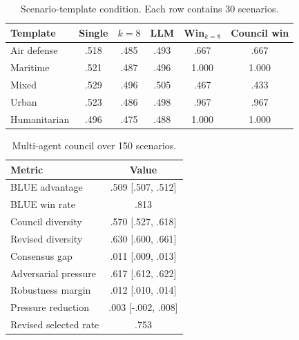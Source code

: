 \documentclass[letterpaper]{article} %
\begin{document}
\begin{table}[t]
\centering
\scriptsize
\caption{Scenario-template condition. Each row contains 30 scenarios.}
\label{tab:terrain}
\begin{tabular}{@{}lccccc@{}}
\toprule
Template & Single & $k{=}8$ & LLM & Win$_{k=8}$ & Council win \\
\midrule
Air defense & .518 & .485 & .493 & .667 & .667 \\
Maritime & .521 & .487 & .496 & 1.000 & 1.000 \\
Mixed & .529 & .496 & .505 & .467 & .433 \\
Urban & .523 & .486 & .498 & .967 & .967 \\
Humanitarian & .496 & .475 & .488 & 1.000 & 1.000 \\
\bottomrule
\end{tabular}
\end{table}

\begin{table}[t]
\centering
\scriptsize
\caption{Multi-agent council over 150 scenarios.}
\label{tab:council}
\begin{tabular}{@{}lc@{}}
\toprule
Metric & Value \\
\midrule
BLUE advantage & .509 [.507, .512] \\
BLUE win rate & .813 \\
Council diversity & .570 [.527, .618] \\
Revised diversity & .630 [.600, .661] \\
Consensus gap & .011 [.009, .013] \\
Adversarial pressure & .617 [.612, .622] \\
Robustness margin & .012 [.010, .014] \\
Pressure reduction & .003 [-.002, .008] \\
Revised selected rate & .753 \\
\bottomrule
\end{tabular}
\end{table}
\end{document}
